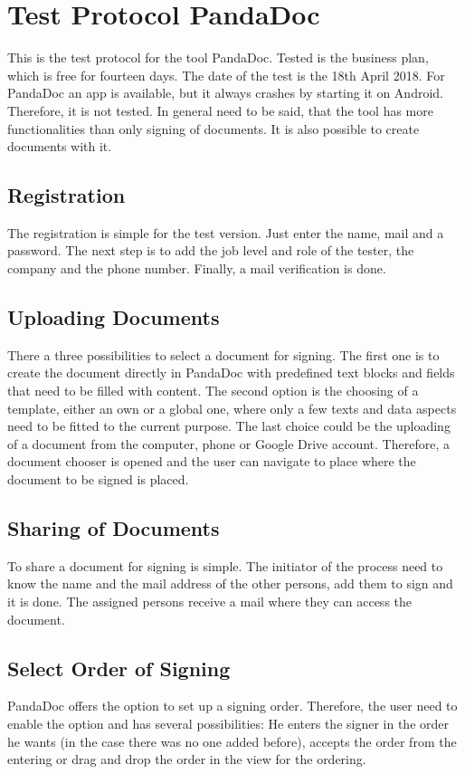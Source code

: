 \section{Test Protocol PandaDoc}
\label{sec:pandadoc}

This is the test protocol for the tool PandaDoc. Tested is the business plan, which is free for fourteen days. The date of the test is the 18th April 2018. For PandaDoc an \gls{app} is available, but it always crashes by starting it on Android. Therefore, it is not tested. In general need to be said, that the tool has more functionalities than only signing of documents. It is also possible to create documents with it.

\subsection{Registration}
The registration is simple for the test version. Just enter the name, mail and a password. The next step is to add the job level and role of the tester, the company and the phone number. Finally, a mail verification is done.

\subsection{Uploading Documents}
There a three possibilities to select a document for signing. The first one is to create the document directly in PandaDoc with predefined text blocks and fields that need to be filled with content. The second option is the choosing of a template, either an own or a global one, where only a few texts and data aspects need to be fitted to the current purpose. The last choice could be the uploading of a document from the computer, phone or Google Drive account. Therefore, a document chooser is opened and the user can navigate to place where the document to be signed is placed.

\subsection{Sharing of Documents}
To share a document for signing is simple. The initiator of the process need to know the name and the mail address of the other persons, add them to sign and it is done. The assigned persons receive a mail where they can access the document.

\subsection{Select Order of Signing}
PandaDoc offers the option to set up a signing order. Therefore, the user need to enable the option and has several possibilities: He enters the signer in the order he wants (in the case there was no one added before), accepts the order from the entering or drag and drop the order in the view for the ordering.

